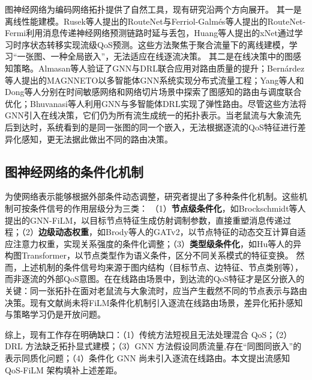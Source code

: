 图神经网络为编码网络拓扑提供了自然工具，现有研究沿两个方向展开。
其一是离线性能建模。Rusek等人提出的RouteNet\cite{Rusek2020_JSAC_RouteNet}与Ferriol-Galm\'{e}s等人提出的RouteNet-Fermi\cite{FerriolGalmes_2023_RouteNetFermi}利用消息传递神经网络预测链路时延与丢包，Huang等人提出的xNet通过学习时序状态转移实现流级QoS预测\cite{Huang2024_ToN_xNetModeling}。这些方法聚焦于聚合流量下的离线建模，学习``一张图、一种全局嵌入''，无法适应在线逐流决策。
其二是在线决策中的图感知策略。Almasan等人验证了GNN与DRL联合应用对路由质量的提升\cite{Almasan2022_RLmeetsGNN}；Bern\'{a}rdez等人提出的MAGNNETO以多智能体GNN系统实现分布式流量工程\cite{Bernardez2023_MAGNNETO_TCCN}；Yang等人和Dong等人分别在时间敏感网络和网络切片场景中探索了图感知的路由与调度联合优化\cite{Yang2022_GCN_RL_IoTJ,Dong2022_GCN_Slicing_Routing_TCCN}；Bhuvanasi等人利用GNN与多智能体DRL实现了弹性路由\cite{Bhuvanasi2023_ResilientRouting_TNSM}。尽管这些方法将GNN引入在线决策，它们仍为所有流生成统一的拓扑表示。当老鼠流与大象流先后到达时，系统看到的是同一张图的同一个嵌入，无法根据逐流的QoS特征进行差异化感知，更无法据此做出不同的路由决策。

\subsection{图神经网络的条件化机制}

为使网络表示能够根据外部条件动态调整，研究者提出了多种条件化机制。这些机制可按条件信号的作用层级分为三类：
（1）\textbf{节点级条件化}，如Brockschmidt等人提出的GNN-FiLM\cite{Brockschmidt2020_GNNFiLM}，以目标节点特征生成仿射调制参数，直接重塑消息传递过程；（2）\textbf{边级动态权重}，如Brody等人的GATv2\cite{Brody2022_GATv2}，以节点特征的动态交互计算自适应注意力权重，实现关系强度的条件化调整；（3）\textbf{类型级条件化}，如Hu等人的异构图Transformer\cite{Hu2020_HGT}，以节点类型作为语义条件，区分不同关系模式的特征变换。
然而，上述机制的条件信号均来源于图内结构（目标节点、边特征、节点类别等），而非逐流的外部QoS意图。在在线路由场景中，到达流的QoS特征才是区分嵌入的关键：同一张拓扑在面对老鼠流与大象流时，应当产生截然不同的节点表示与路由决策。现有文献尚未将FiLM条件化机制引入逐流在线路由场景，差异化拓扑感知与策略学习仍是开放问题。


综上，现有工作存在明确缺口：（1）传统方法短视且无法处理混合 QoS；（2）DRL 方法缺乏拓扑显式建模；（3）GNN 方法假设同质流量,存在``同图同嵌入''的表示同质化问题；（4）条件化 GNN 尚未引入逐流在线路由。本文提出流感知 QoS-FiLM 架构填补上述差距。